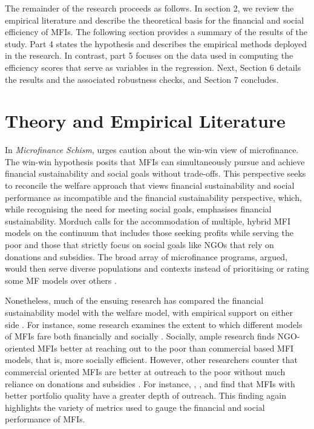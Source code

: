 \documentclass[a4paper, nobind]{templates/ociamthesis}
\begin{document}
The remainder of the research proceeds as follows. In section 2, we review the empirical literature and describe the theoretical basis for the financial and social efficiency of MFIs. The following section provides a summary of the results of the study. Part 4 states the hypothesis and describes the empirical methods deployed in the research. In contrast, part 5 focuses on the data used in computing the efficiency scores that serve as variables in the regression. Next, Section 6 details the results and the associated robustness checks, and Section 7 concludes.

\hypertarget{theory-and-empirical-literature-1}{%
\section{Theory and Empirical Literature}\label{theory-and-empirical-literature-1}}

In \emph{Microfinance Schism}, \textcite{morduch2000microfinance} urges caution about the win-win view of microfinance. The win-win hypothesis posits that MFIs can simultaneously pursue and achieve financial sustainability and social goals without trade-offs. This perspective seeks to reconcile the welfare approach that views financial sustainability and social performance as incompatible and the financial sustainability perspective, which, while recognising the need for meeting social goals, emphasises financial sustainability. Morduch calls for the accommodation of multiple, hybrid MFI models on the continuum that includes those seeking profits while serving the poor and those that strictly focus on social goals like NGOs that rely on donations and subsidies. The broad array of microfinance programs, \textcite{morduch2000microfinance} argued, would then serve diverse populations and contexts instead of prioritising or rating some MF models over others \autocite{marconatto2016going}.

Nonetheless, much of the ensuing research has compared the financial sustainability model with the welfare model, with empirical support on either side \autocite{kodongo2013individual}. For instance, some research examines the extent to which different models of MFIs fare both financially and socially \autocite{abeysekera2014sustainability,bedecarrats2012combining}. Socially, ample research finds NGO-oriented MFIs better at reaching out to the poor than commercial based MFI models, that is, more socially efficient. However, other researchers counter that commercial oriented MFIs are better at outreach to the poor without much reliance on donations and subsidies \autocite{abeysekera2014sustainability,kar2013mission,roberts2013profit}. For instance, \textcite{dorfleitner2017microfinance}, \textcite{dorfleitner2017access}, and \textcite{bos2015practice} find that MFIs with better portfolio quality have a greater depth of outreach. This finding again highlights the variety of metrics used to gauge the financial and social performance of MFIs.
\end{document}
